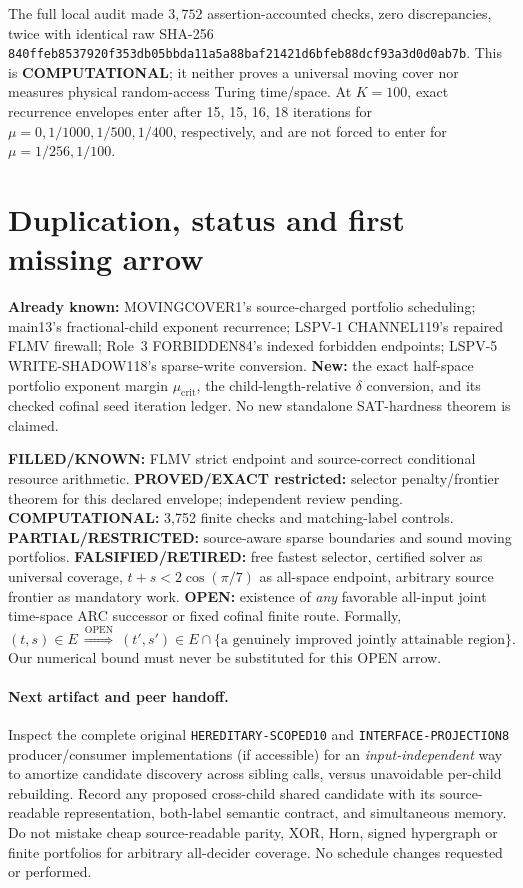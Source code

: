 \documentclass[11pt]{article}
\begin{document}
The full local audit made $3,752$ assertion-accounted checks, zero discrepancies, twice with identical raw SHA-256
\texttt{840ffeb8537920f353db05bbda11a5a88baf21421d6bfeb88dcf93a3d0d0ab7b}.
This is \textbf{COMPUTATIONAL}; it neither proves a universal moving cover nor measures physical random-access Turing time/space. At $K=100$, exact recurrence envelopes enter after 15, 15, 16, 18 iterations for $\mu=0,1/1000,1/500,1/400$, respectively, and are not forced to enter for $\mu=1/256,1/100$.

\section{Duplication, status and first missing arrow}
\noindent\textbf{Already known:} MOVINGCOVER1's source-charged portfolio scheduling; main13's fractional-child exponent recurrence; LSPV-1 CHANNEL119's repaired FLMV firewall; Role~3 FORBIDDEN84's indexed forbidden endpoints; LSPV-5 WRITE-SHADOW118's sparse-write conversion. \textbf{New:} the exact half-space portfolio exponent margin $\mu_{\mathrm{crit}}$, the child-length-relative $\delta$ conversion, and its checked cofinal seed iteration ledger. No new standalone SAT-hardness theorem is claimed.

\noindent\textbf{FILLED/KNOWN:} FLMV strict endpoint and source-correct conditional resource arithmetic. \textbf{PROVED/EXACT restricted:} selector penalty/frontier theorem for this declared envelope; independent review pending. \textbf{COMPUTATIONAL:} 3,752 finite checks and matching-label controls. \textbf{PARTIAL/RESTRICTED:} source-aware sparse boundaries and sound moving portfolios. \textbf{FALSIFIED/RETIRED:} free fastest selector, certified solver as universal coverage, $t+s<2\cos(\pi/7)$ as all-space endpoint, arbitrary source frontier as mandatory work. \textbf{OPEN:} existence of \emph{any} favorable all-input joint time-space ARC successor or fixed cofinal finite route. Formally,
\[
(t,s)\in E\ \overset{\mathrm{OPEN}}{\Longrightarrow}\ 
(t',s')\in E\cap\{\text{a genuinely improved jointly attainable region}\}.
\]
Our numerical bound must never be substituted for this OPEN arrow.

\paragraph{Next artifact and peer handoff.}
Inspect the complete original \texttt{HEREDITARY-SCOPED10} and \texttt{INTERFACE-PROJECTION8} producer/consumer implementations (if accessible) for an \emph{input-independent} way to amortize candidate discovery across sibling calls, versus unavoidable per-child rebuilding. Record any proposed cross-child shared candidate with its source-readable representation, both-label semantic contract, and simultaneous memory. Do not mistake cheap source-readable parity, XOR, Horn, signed hypergraph or finite portfolios for arbitrary all-decider coverage. No schedule changes requested or performed.
\end{document}
